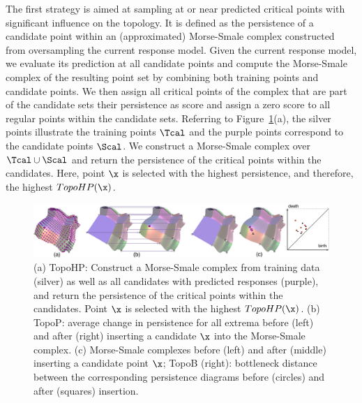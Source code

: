  The first strategy is aimed at sampling at or near predicted critical points with significant influence on the topology.
%
It is defined as the persistence of a candidate point within an (approximated) Morse-Smale complex constructed from oversampling the current response model.
%
Given the current response model, we evaluate its prediction at all candidate points and compute the Morse-Smale complex of the resulting point set by combining both training points and candidate points.
%
We then assign all critical points of the complex that are part of the candidate sets their persistence as score and assign a zero score to all regular points within the candidate sets.
%
Referring to Figure~\ref{fig:topo-all}(a), the silver points illustrate the training points $\Tcal$ and the purple points correspond to the candidate points $\Scal$.
%
We construct a Morse-Smale complex over $\Tcal \cup \Scal$ and return the persistence of the critical points within the candidates.
%
Here, point $\x$ is selected with the highest persistence, and therefore, the highest $TopoHP(\x)$.

\begin{figure}[!t]
\begin{center}
\includegraphics[width=1.0\linewidth]{figs/chap5/topo-all}
\caption[Illustration of topological scoring methods]{(a) TopoHP: Construct a Morse-Smale complex from training data (silver) as well as all candidates with predicted responses (purple), and return the persistence of the critical points within the candidates.
%
Point $\protect\x$ is selected with the highest $TopoHP(\protect\x)$.
%
(b) TopoP: average change in persistence for all extrema before (left) and after (right) inserting a candidate $\protect\x$ into the Morse-Smale complex.
%
(c) Morse-Smale complexes before (left) and after (middle) inserting a candidate point $\protect\x$;
%
TopoB (right): bottleneck distance between the corresponding persistence diagrams before (circles) and after (squares) insertion.}
\label{fig:topo-all}
\end{center}
\end{figure}

